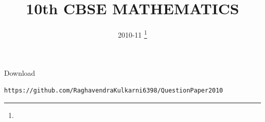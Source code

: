 \documentclass[journal,12pt,twocolumn]{IEEEtran}
\DeclareMathOperator*{\Res}{Res}
\begin{document}
\newtheorem{theorem}{Theorem}[section]
\newtheorem{problem}{Problem}
\newtheorem{proposition}{Proposition}[section]
\newtheorem{lemma}{Lemma}[section]
\newtheorem{corollary}[theorem]{Corollary}
\newtheorem{example}{Example}[section]
\newtheorem{definition}[problem]{Definition}
\newcommand{\BEQA}{\begin{eqnarray}}
\newcommand{\EEQA}{\end{eqnarray}}
\newcommand{\define}{\stackrel{\triangle}{=}}

\providecommand{\mbf}{\mathbf}
\providecommand{\pr}[1]{\ensuremath{\Pr\left(#1\right)}}
\providecommand{\qfunc}[1]{\ensuremath{Q\left(#1\right)}}
\providecommand{\sbrak}[1]{\ensuremath{{}\left[#1\right]}}
\providecommand{\lsbrak}[1]{\ensuremath{{}\left[#1\right.}}
\providecommand{\rsbrak}[1]{\ensuremath{{}\left.#1\right]}}
\providecommand{\brak}[1]{\ensuremath{\left(#1\right)}}
\providecommand{\lbrak}[1]{\ensuremath{\left(#1\right.}}
\providecommand{\rbrak}[1]{\ensuremath{\left.#1\right)}}
\providecommand{\cbrak}[1]{\ensuremath{\left\{#1\right\}}}
\providecommand{\lcbrak}[1]{\ensuremath{\left\{#1\right.}}
\providecommand{\rcbrak}[1]{\ensuremath{\left.#1\right\}}}
\theoremstyle{remark}
\newtheorem{rem}{Remark}
\newcommand{\sgn}{\mathop{\mathrm{sgn}}}
\providecommand{\abs}[1]{\left\vert#1\right\vert}
\providecommand{\res}[1]{\Res\displaylimits_{#1}} 
\providecommand{\norm}[1]{\left\lVert#1\right\rVert}
\providecommand{\mtx}[1]{\mathbf{#1}}
\providecommand{\mean}[1]{E\left[ #1 \right]}
\providecommand{\fourier}{\overset{\mathcal{F}}{ \rightleftharpoons}}
\providecommand{\system}{\overset{\mathcal{H}}{ \longleftrightarrow}}
\newcommand{\solution}{\noindent \textbf{Solution: }}
\newcommand{\cosec}{\,\text{cosec}\,}
\providecommand{\dec}[2]{\ensuremath{\overset{#1}{\underset{#2}{\gtrless}}}}
\newcommand{\myvec}[1]{\ensuremath{\begin{pmatrix}#1\end{pmatrix}}}
\newcommand{\mydet}[1]{\ensuremath{\begin{vmatrix}#1\end{vmatrix}}}
\makeatletter
{}
\makeatother
\let\StandardTheFigure\thefigure
\let\vec\mathbf
\renewcommand{\thefigure}{\theproblem}
\def\putbox#1#2#3{\makebox[0in][l]{\makebox[#1][l]{}\raisebox{\baselineskip}[0in][0in]{\raisebox{#2}[0in][0in]{#3}}}}
     \def\rightbox#1{\makebox[0in][r]{#1}}
     \def\centbox#1{\makebox[0in]{#1}}
     \def\topbox#1{\raisebox{-\baselineskip}[0in][0in]{#1}}
     \def\midbox#1{\raisebox{-0.5\baselineskip}[0in][0in]{#1}}
\vspace{3cm}
\title{10th CBSE MATHEMATICS}
\author{ 2010-11
	\thanks{}
}
\maketitle
\newpage
\bigskip
\renewcommand{\thefigure}{\theenumi}
\renewcommand{\thetable}{\theenumi}
Download 
\begin{lstlisting}
https://github.com/RaghavendraKulkarni6398/QuestionPaper2010
\end{lstlisting}
\end{document}
